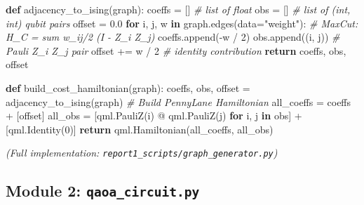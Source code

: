 \documentclass[
  11pt,
]{report}
\newenvironment{Shaded}{}{}
\newcommand{\CommentTok}[1]{\textcolor[rgb]{0.38,0.63,0.69}{\textit{#1}}}
\newcommand{\ControlFlowTok}[1]{\textcolor[rgb]{0.00,0.44,0.13}{\textbf{#1}}}
\newcommand{\DecValTok}[1]{\textcolor[rgb]{0.25,0.63,0.44}{#1}}
\newcommand{\FloatTok}[1]{\textcolor[rgb]{0.25,0.63,0.44}{#1}}
\newcommand{\KeywordTok}[1]{\textcolor[rgb]{0.00,0.44,0.13}{\textbf{#1}}}
\newcommand{\NormalTok}[1]{#1}
\newcommand{\OperatorTok}[1]{\textcolor[rgb]{0.40,0.40,0.40}{#1}}
\newcommand{\StringTok}[1]{\textcolor[rgb]{0.25,0.44,0.63}{#1}}
\begin{document}
\begin{Shaded}
\begin{Highlighting}[]
\KeywordTok{def}\NormalTok{ adjacency\_to\_ising(graph):}
\NormalTok{    coeffs }\OperatorTok{=}\NormalTok{ []                         }\CommentTok{\# list of float}
\NormalTok{    obs }\OperatorTok{=}\NormalTok{ []                            }\CommentTok{\# list of (int, int) qubit pairs}
\NormalTok{    offset }\OperatorTok{=} \FloatTok{0.0}
    \ControlFlowTok{for}\NormalTok{ i, j, w }\KeywordTok{in}\NormalTok{ graph.edges(data}\OperatorTok{=}\StringTok{"weight"}\NormalTok{):}
        \CommentTok{\# MaxCut: H\_C = sum w\_ij/2 (I {-} Z\_i Z\_j)}
\NormalTok{        coeffs.append(}\OperatorTok{{-}}\NormalTok{w }\OperatorTok{/} \DecValTok{2}\NormalTok{)}
\NormalTok{        obs.append((i, j))              }\CommentTok{\# Pauli Z\_i Z\_j pair}
\NormalTok{        offset }\OperatorTok{+=}\NormalTok{ w }\OperatorTok{/} \DecValTok{2}                 \CommentTok{\# identity contribution}
    \ControlFlowTok{return}\NormalTok{ coeffs, obs, offset}


\KeywordTok{def}\NormalTok{ build\_cost\_hamiltonian(graph):}
\NormalTok{    coeffs, obs, offset }\OperatorTok{=}\NormalTok{ adjacency\_to\_ising(graph)}
    \CommentTok{\# Build PennyLane Hamiltonian}
\NormalTok{    all\_coeffs }\OperatorTok{=}\NormalTok{ coeffs }\OperatorTok{+}\NormalTok{ [offset]}
\NormalTok{    all\_obs }\OperatorTok{=}\NormalTok{ [qml.PauliZ(i) }\OperatorTok{@}\NormalTok{ qml.PauliZ(j) }\ControlFlowTok{for}\NormalTok{ i, j }\KeywordTok{in}\NormalTok{ obs] }\OperatorTok{+}\NormalTok{ [qml.Identity(}\DecValTok{0}\NormalTok{)]}
    \ControlFlowTok{return}\NormalTok{ qml.Hamiltonian(all\_coeffs, all\_obs)}
\end{Highlighting}
\end{Shaded}

\emph{(Full implementation:
\texttt{report1\_scripts/graph\_generator.py})}

\subsection{\texorpdfstring{Module 2:
\texttt{qaoa\_circuit.py}}{Module 2: qaoa\_circuit.py}}\label{module-2-qaoa_circuit.py}
\end{document}
